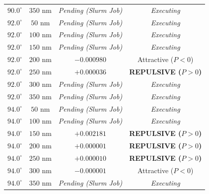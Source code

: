 \begin{table}[h!]
\begin{tabular}{cccc}
$90.0^\circ$ & $350$ nm & \textit{Pending (Slurm Job)} & \textit{Executing} \\
$92.0^\circ$ & $50$ nm & \textit{Pending (Slurm Job)} & \textit{Executing} \\
$92.0^\circ$ & $100$ nm & \textit{Pending (Slurm Job)} & \textit{Executing} \\
$92.0^\circ$ & $150$ nm & \textit{Pending (Slurm Job)} & \textit{Executing} \\
$92.0^\circ$ & $200$ nm & $-0.000980$ & Attractive ($P<0$) \\
$92.0^\circ$ & $250$ nm & $+0.000036$ & \textbf{REPULSIVE ($P>0$)} \\
$92.0^\circ$ & $300$ nm & \textit{Pending (Slurm Job)} & \textit{Executing} \\
$92.0^\circ$ & $350$ nm & \textit{Pending (Slurm Job)} & \textit{Executing} \\
$94.0^\circ$ & $50$ nm & \textit{Pending (Slurm Job)} & \textit{Executing} \\
$94.0^\circ$ & $100$ nm & \textit{Pending (Slurm Job)} & \textit{Executing} \\
$94.0^\circ$ & $150$ nm & $+0.002181$ & \textbf{REPULSIVE ($P>0$)} \\
$94.0^\circ$ & $200$ nm & $+0.000001$ & \textbf{REPULSIVE ($P>0$)} \\
$94.0^\circ$ & $250$ nm & $+0.000010$ & \textbf{REPULSIVE ($P>0$)} \\
$94.0^\circ$ & $300$ nm & $-0.000001$ & Attractive ($P<0$) \\
$94.0^\circ$ & $350$ nm & \textit{Pending (Slurm Job)} & \textit{Executing} \\
\hline
\end{tabular}
\end{table}


